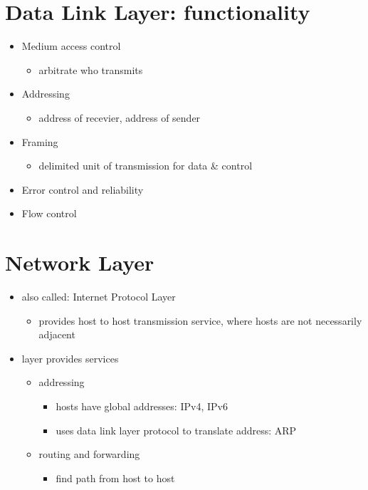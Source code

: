 \documentclass{report}
\begin{document}
\section{Data Link Layer: functionality}
\begin{itemize}
\item Medium access control
 \begin{itemize}[label=$\circ$]
   \item arbitrate who transmits
 \end{itemize} 
\item Addressing
  \begin{itemize}[label=$\circ$]
    \item address of recevier, address of sender
  \end{itemize}
  \item Framing
    \begin{itemize}[label=$\circ$]
      \item delimited unit of transmission for data \& control
    \end{itemize}
  \item Error control and reliability
  \item Flow control
\end{itemize}
\section{Network Layer}
\begin{itemize}
  \item also called: Internet Protocol Layer
    \begin{itemize}[label=$\circ$]
      \item provides host to host transmission service,
        \subitem where hosts are not necessarily adjacent
    \end{itemize}
  \item layer provides services
    \begin{itemize}[label=$\circ$]
      \item addressing
        \begin{itemize}[label=$\bullet$]
        \item hosts have global addresses: IPv4, IPv6 
        \item uses data link layer protocol to translate address: ARP
        \end{itemize}
      \item routing and forwarding
        \begin{itemize}[label=$\bulllet$]
          \item find path from host to host
        \end{itemize}
    \end{itemize}
\end{itemize}
\end{document}
